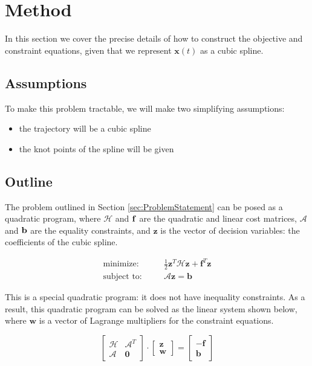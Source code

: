 \section{Method}

In this section we cover the precise details of how to construct the objective and constraint equations,
given that we represent $\bm{x}(t)$ as a cubic spline.

\subsection{Assumptions}

To make this problem tractable, we will make two simplifying assumptions:
\begin{itemize}
  \setlength\itemsep{0em}
  \item the trajectory will be a cubic spline
  \item the knot points of the spline will be given
\end{itemize}

\subsection{Outline}

The problem outlined in Section \ref{sec:ProblemStatement} can be posed as a quadratic program,
where $\mathcal{H}$ and $\bf{f}$ are the quadratic and linear cost matrices,
$\mathcal{A}$ and $\bf{b}$ are the equality constraints, and
$\bm{z}$ is the vector of decision variables: the coefficients of the cubic spline.

\begin{align}
  & \quad  & \quad & \quad &
    \text{minimize:}  & \quad  & \tfrac{1}{2} \bm{z}^T \mathcal{H} \bm{z} + \bm{f}^T \bm{z}
  & \quad  & \quad &  \quad &\\
  & \quad  & \quad & \quad &
    \text{subject to:}  & \quad & \mathcal{A} \bm{z} = \bm{b}
  & \quad  & \quad & \quad &
\end{align}

This is a special quadratic program: it does not have inequality constraints.
As a result, this quadratic program can be solved as the linear system shown below,
where $\bm{w}$ is a vector of Lagrange multipliers for the constraint equations.

\begin{equation}

\begin{bmatrix}
\mathcal{H} & \mathcal{A}^T \\
\mathcal{A} & \bm{0}
\end{bmatrix}
\cdot
\begin{bmatrix}
\bm{z} \\
\bm{w}
\end{bmatrix}
=
\begin{bmatrix}
-\bm{f}  \\
\bm{b}
\end{bmatrix}

\label{eqn:linearSplineSystem}
\end{equation}

